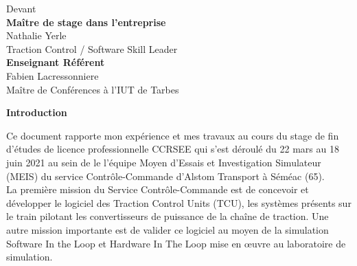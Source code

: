 \documentclass[a4paper]{report}
\begin{document}
\begin{center}
			\vspace*{1cm}
			\large{Devant}\\
			
			\vspace*{1cm}
			\large{\textbf{Maître de stage dans l'entreprise}}\\
			\large{Nathalie Yerle }\\
			Traction Control / Software Skill Leader\\
			
			\vspace*{1cm}
			\large{\textbf{Enseignant Référent}}\\
			\large{Fabien Lacressonniere }\\
			Maître de Conférences à l'IUT de Tarbes\\
			
					
		\end{center}
	\pagebreak %
	
		
		\begin{center}
			\textbf{Introduction}
		\end{center}
		{\huge C}e document rapporte mon expérience et mes travaux au cours du stage de fin d'études de licence professionnelle CCRSEE qui s'est déroulé du 22 mars au 18 juin 2021 au sein de le l'équipe Moyen d'Essais et Investigation Simulateur (MEIS) du service Contrôle-Commande d'Alstom Transport à Séméac (65).\\
		
		La première mission du Service Contrôle-Commande est de concevoir et développer le logiciel des Traction Control Units (TCU), les systèmes présents sur le train pilotant les convertisseurs de puissance de la chaîne de traction. Une autre mission importante est de valider ce logiciel au moyen de la simulation Software In the Loop et Hardware In The Loop mise en œuvre au laboratoire de simulation.\\
		
\end{document}
